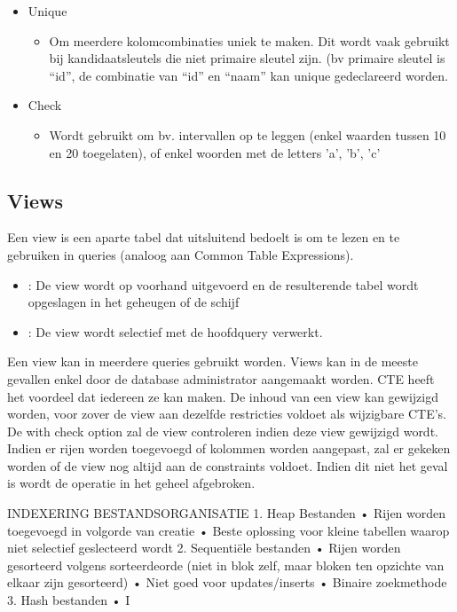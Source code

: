 \documentclass{article}
\begin{document}
\begin{itemize}
{\begin{itemize}
      \end{itemize}
    }
  \item {Unique
      \begin{itemize}
      \item {Om meerdere kolomcombinaties uniek te maken. Dit wordt vaak gebruikt bij kandidaatsleutels die niet primaire sleutel zijn. (bv primaire sleutel is ``id'', de combinatie van ``id'' en ``naam'' kan unique gedeclareerd worden.}
      \end{itemize}}
  \item {Check
      \begin{itemize}
        \item{Wordt gebruikt om bv. intervallen op te leggen (enkel waarden tussen 10 en 20 toegelaten), of enkel woorden met de letters 'a', 'b', 'c'}
      \end{itemize}}
\end{itemize}
\subsection{Views}
Een view is een aparte tabel dat uitsluitend bedoelt is om te lezen en te gebruiken in queries (analoog aan Common Table Expressions).
\begin{itemize}
\item {: De view wordt op voorhand uitgevoerd en de resulterende tabel wordt opgeslagen in het geheugen of de schijf }
  \item {: De view wordt selectief met de hoofdquery verwerkt.}
\end{itemize}
Een view kan in meerdere queries gebruikt worden. Views kan in de meeste gevallen enkel door de database administrator aangemaakt worden. CTE heeft het voordeel dat iedereen ze kan maken.
De inhoud van een view kan gewijzigd worden, voor zover de view aan dezelfde restricties voldoet als wijzigbare CTE’s. De with check option zal de view controleren indien deze view gewijzigd wordt. Indien er rijen worden toegevoegd of kolommen worden aangepast, zal er gekeken worden of de view nog altijd aan de constraints voldoet. Indien dit niet het geval is wordt de operatie in het geheel afgebroken.


INDEXERING
BESTANDSORGANISATIE
1.	Heap Bestanden
•	Rijen worden toegevoegd in volgorde van creatie
•	Beste oplossing voor kleine tabellen waarop niet selectief geslecteerd wordt
2.	Sequentiële bestanden
•	Rijen worden gesorteerd volgens sorteerdeorde (niet in blok zelf, maar bloken ten opzichte van elkaar zijn gesorteerd)
•	Niet goed voor updates/inserts
•	Binaire zoekmethode
3.	Hash bestanden
•	I
\end{document}
